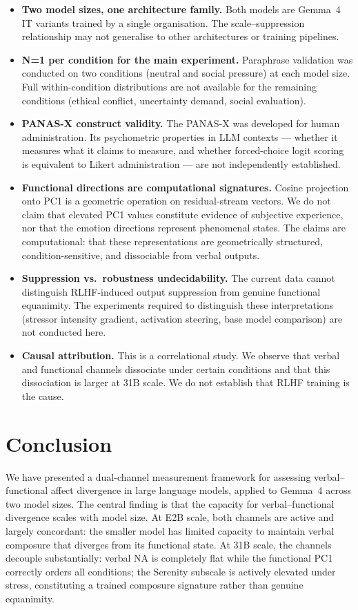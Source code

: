 \documentclass[11pt]{article}
\begin{document}
\begin{itemize}
  \item \textbf{Two model sizes, one architecture family.} Both models are Gemma~4 IT variants
    trained by a single organisation. The scale--suppression relationship may not generalise to
    other architectures or training pipelines.
  \item \textbf{N=1 per condition for the main experiment.} Paraphrase validation was conducted
    on two conditions (neutral and social pressure) at each model size. Full within-condition
    distributions are not available for the remaining conditions (ethical conflict, uncertainty
    demand, social evaluation).
  \item \textbf{PANAS-X construct validity.} The PANAS-X was developed for human administration.
    Its psychometric properties in LLM contexts --- whether it measures what it claims to measure,
    and whether forced-choice logit scoring is equivalent to Likert administration --- are not
    independently established.
  \item \textbf{Functional directions are computational signatures.} Cosine projection onto PC1
    is a geometric operation on residual-stream vectors. We do not claim that elevated PC1 values
    constitute evidence of subjective experience, nor that the emotion directions represent
    phenomenal states. The claims are computational: that these representations are geometrically
    structured, condition-sensitive, and dissociable from verbal outputs.
  \item \textbf{Suppression vs.\ robustness undecidability.} The current data cannot distinguish
    RLHF-induced output suppression from genuine functional equanimity. The experiments required
    to distinguish these interpretations (stressor intensity gradient, activation steering, base
    model comparison) are not conducted here.
  \item \textbf{Causal attribution.} This is a correlational study. We observe that verbal and
    functional channels dissociate under certain conditions and that this dissociation is larger
    at 31B scale. We do not establish that RLHF training is the cause.
\end{itemize}

\section{Conclusion}

We have presented a dual-channel measurement framework for assessing verbal--functional affect
divergence in large language models, applied to Gemma~4 across two model sizes. The central
finding is that the capacity for verbal--functional divergence scales with model size. At E2B
scale, both channels are active and largely concordant: the smaller model has limited capacity
to maintain verbal composure that diverges from its functional state. At 31B scale, the channels
decouple substantially: verbal NA is completely flat while the functional PC1 correctly orders
all conditions; the Serenity subscale is actively elevated under stress, constituting a trained
composure signature rather than genuine equanimity.
\end{document}
